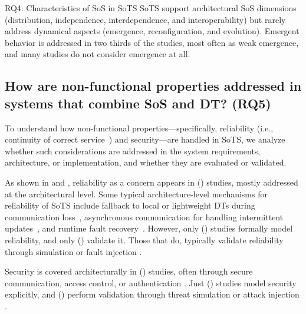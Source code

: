 \begin{conclusionframe}{RQ4: Characteristics of SoS in SoTS}
SoTS support architectural SoS dimensions (distribution, independence, interdependence, and interoperability) but rarely address dynamical aspects (emergence, reconfiguration, and evolution). Emergent behavior is addressed in two thirds of the studies, most often as weak emergence, and many studies do not consider emergence at all.
\end{conclusionframe}





\subsection{How are non-functional properties addressed in systems that combine SoS and DT? (RQ5)}\label{results-rq5}

To understand how non-functional properties---specifically, reliability (i.e., continuity of correct service~\cite{avizienis2004basic}) and security---are handled in SoTS, we analyze whether such considerations are addressed in the system requirements, architecture, or implementation, and whether they are evaluated or validated.




As shown in  and , reliability as a concern appears in () studies, mostly addressed at the architectural level. Some typical architecture-level mechanisms for reliability of SoTS include fallback to local or lightweight DTs during communication loss~\cite{alam2017c2ps, larsen2024towards}, asynchronous communication for handling intermittent updates~\cite{acharya2023twins, liu2020web-based}, and runtime fault recovery~\cite{esterle2021digital, villalonga2021decision-making}. However, only () studies formally model reliability, and only () validate it. Those that do, typically validate reliability through simulation or fault injection \cite{park2020digital, saraeian2022digital}.

Security is covered architecturally in () studies, often through secure communication, access control, or authentication \cite{aziz2022empowering, acharya2023twins, dobie2024network}. Just () studies model security explicitly, and () perform validation through threat simulation or attack injection \cite{malayjerdi2022combined, stary2022privacy}.

